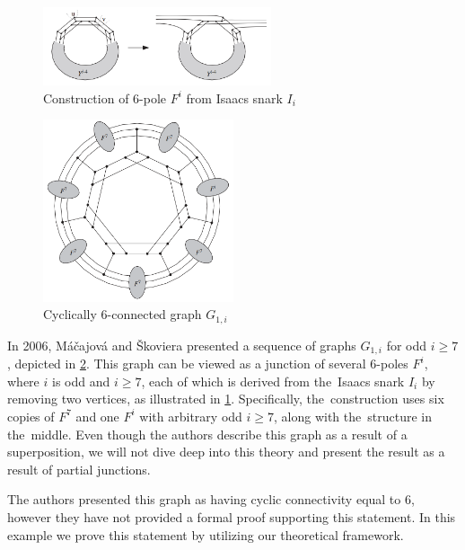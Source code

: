 \documentclass[12pt, twoside]{book}
\begin{document}
\begin{example}
	\begin{figure}
		\centering
		\includegraphics[width=0.6\textwidth]{images/create-Fi-from-Isaacs}
		\caption{\cite{Macajova2006} Construction of 6-pole $F^i$ from Isaacs snark $I_i$}
		\label{fig:construction-fi-from-isaacs}
	\end{figure}

	\begin{figure}
		\centering
		\includegraphics[width=0.5\textwidth]{images/snark-Gi-from-Isaacs}
		\caption{\cite{Macajova2006} Cyclically 6-connected graph $G_{1,i}$}
		\label{fig:cyc-6-graph-Macajova}
	\end{figure}

	In 2006, Máčajová and Škoviera presented a sequence of graphs $G_{1,i}$ for odd $i\geq 7$ \cite{Macajova2006}, depicted in \cref{fig:cyc-6-graph-Macajova}. This graph can be viewed as a junction of several 6-poles $F^i$, where $i$ is odd and $i\geq 7$, each of which is derived from the~Isaacs snark $I_i$ \cite{Isaacs1975} by removing two vertices, as illustrated in \cref{fig:construction-fi-from-isaacs}. Specifically, the~construction uses six copies of $F^7$ and one $F^i$ with arbitrary odd $i\geq 7$, along with the~structure in the~middle. Even though the authors describe this graph as a result of a superposition, we will not dive deep into this theory and present the result as a result of partial junctions.
	
	The authors presented this graph as having cyclic connectivity equal to 6, however they have not provided a formal proof supporting this statement. In this example we prove this statement by utilizing our theoretical framework.
	

\end{example}
\end{document}
